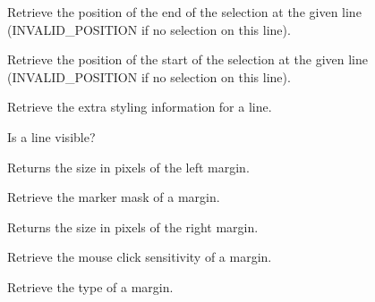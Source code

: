 Retrieve the position of the end of the selection at the given line (INVALID\_POSITION if no selection on this line).


\label{wxstyledtextctrlgetlineselstartposition}


Retrieve the position of the start of the selection at the given line (INVALID\_POSITION if no selection on this line).


\label{wxstyledtextctrlgetlinestate}


Retrieve the extra styling information for a line.


\label{wxstyledtextctrlgetlinevisible}


Is a line visible?


\label{wxstyledtextctrlgetmarginleft}


Returns the size in pixels of the left margin.


\label{wxstyledtextctrlgetmarginmask}


Retrieve the marker mask of a margin.


\label{wxstyledtextctrlgetmarginright}


Returns the size in pixels of the right margin.


\label{wxstyledtextctrlgetmarginsensitive}


Retrieve the mouse click sensitivity of a margin.


\label{wxstyledtextctrlgetmargintype}


Retrieve the type of a margin.


